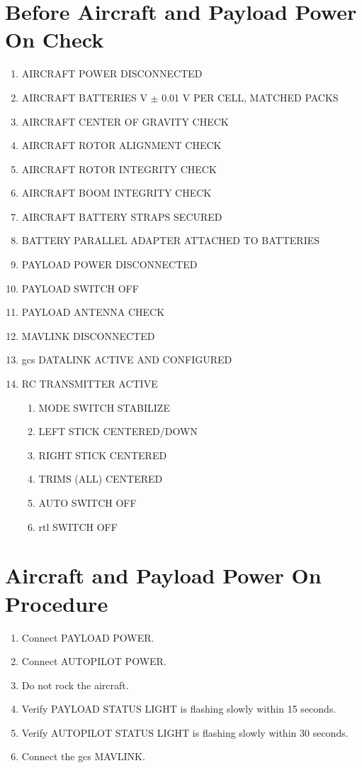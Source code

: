 \documentclass{report}
\begin{document}
	\section{Before Aircraft and Payload Power On Check}
		\begin{enumerate}
			\item AIRCRAFT POWER \hrulefill DISCONNECTED
			\item AIRCRAFT BATTERIES  V $\pm$ 0.01 V PER CELL, MATCHED PACKS
			\item AIRCRAFT CENTER OF GRAVITY \hrulefill CHECK
			\item AIRCRAFT ROTOR ALIGNMENT \hrulefill CHECK
			\item AIRCRAFT ROTOR INTEGRITY \hrulefill CHECK
			\item AIRCRAFT BOOM INTEGRITY \hrulefill CHECK
			\item AIRCRAFT BATTERY STRAPS \hrulefill SECURED
			\item BATTERY PARALLEL ADAPTER \hrulefill ATTACHED TO BATTERIES
			\item PAYLOAD POWER \hrulefill DISCONNECTED
			\item PAYLOAD SWITCH \hrulefill OFF
			\item PAYLOAD ANTENNA \hrulefill CHECK
			\item MAVLINK \hrulefill DISCONNECTED
			\item \gls{gcs} DATALINK \hrulefill ACTIVE AND CONFIGURED
			\item RC TRANSMITTER \hrulefill ACTIVE
			\begin{enumerate}
				\item MODE SWITCH \hrulefill STABILIZE
				\item LEFT STICK \hrulefill CENTERED/DOWN
				\item RIGHT STICK \hrulefill CENTERED
				\item TRIMS (ALL) \hrulefill CENTERED
				\item AUTO SWITCH \hrulefill OFF
				\item \gls{rtl} SWITCH \hrulefill OFF
			\end{enumerate}
		\end{enumerate}
	\section{Aircraft and Payload Power On Procedure}
		\begin{enumerate}
			\item Connect PAYLOAD POWER.
			\item Connect AUTOPILOT POWER.
			\item Do not rock the aircraft.
			\item Verify PAYLOAD STATUS LIGHT is flashing slowly within 15 seconds.
			\item Verify AUTOPILOT STATUS LIGHT is flashing slowly within 30 seconds.
			\item Connect the \gls{gcs} MAVLINK.
		\end{enumerate}
\end{document}
